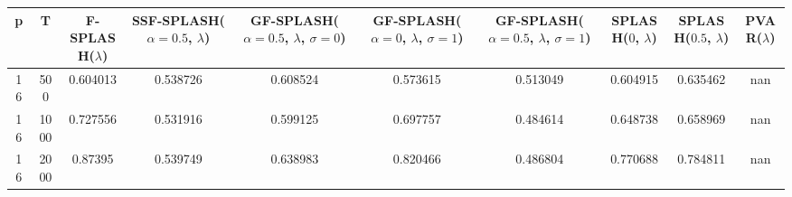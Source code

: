 \begin{tabular}{cccccccccc}
\hline
  p  &  T   &  F-SPLASH($\lambda$)  &  SSF-SPLASH($\alpha=0.5$, $\lambda$)  &  GF-SPLASH($\alpha=0.5$, $\lambda$, $\sigma=0$)  &  GF-SPLASH($\alpha=0$, $\lambda$, $\sigma=1$)  &  GF-SPLASH($\alpha=0.5$, $\lambda$, $\sigma=1$)  &  SPLASH($0$, $\lambda$)  &  SPLASH($0.5$, $\lambda$)  &  PVAR($\lambda$)  \\
\hline
 16  & 500  &       0.604013        &               0.538726                &                     0.608524                     &                    0.573615                    &                     0.513049                     &         0.604915         &          0.635462          &        nan        \\
 16  & 1000 &       0.727556        &               0.531916                &                     0.599125                     &                    0.697757                    &                     0.484614                     &         0.648738         &          0.658969          &        nan        \\
 16  & 2000 &        0.87395        &               0.539749                &                     0.638983                     &                    0.820466                    &                     0.486804                     &         0.770688         &          0.784811          &        nan        \\
\hline
\end{tabular}